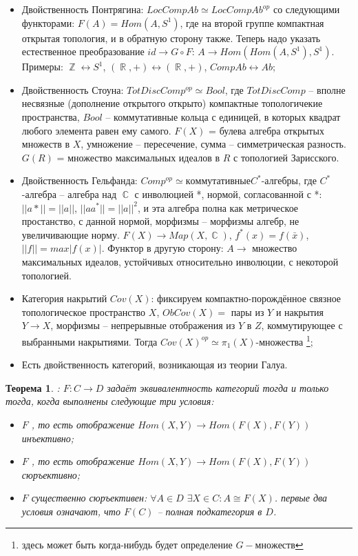 \documentclass[a4paper]{article}
\theoremstyle{indented}
\newtheorem{theorem}{Теорема}
\theoremstyle{definition}
\theoremstyle{remark}
\DeclareMathOperator{\CC}{\mathbb{C}}
\DeclareMathOperator{\ZZ}{\mathbb{Z}}
\DeclareMathOperator{\RR}{\mathbb{R}}
\begin{document}
\begin{itemize}
\item Двойственность Понтрягина: $LocCompAb\simeq LocCompAb^{op}$ со следующими функторами: $F(A) = Hom(A, S^1)$, где на второй группе компактная открытая топология, и в обратную сторону также. Теперь надо указать естественное преобразование $id \rightarrow G\circ F$: $A \rightarrow Hom(Hom(A, S^1), S^1)$. Примеры: $\ZZ \longleftrightarrow S^1$, $(\RR, +) \longleftrightarrow (\RR, +)$, $CompAb \longleftrightarrow Ab$;
\item Двойственность Стоуна: $TotDiscComp^{op} \simeq  Bool$, где $TotDiscComp$ -- вполне несвязные (дополнение открытого открыто) компактные топологичекие пространства, $Bool$ -- коммутативные кольца с единицей, в которых квадрат любого элемента равен ему самого. $F(X)$ = булева алгебра открытых множеств в $X$, умножение -- пересечение, сумма -- симметрическая разность. $G(R)$ = множество максимальных идеалов в $R$ с топологией Зарисского.
\item Двойственность Гельфанда: $Comp^{op} \simeq коммутативные C^*$-алгебры, где $C^*$-алгебра -- алгебра над $\CC$ с инволюцией *, нормой, согласованной с *: $||a*|| = ||a||$, $||aa^*|| = ||a||^2$, и эта алгебра полна как метрическое простанство, с данной нормой, морфизмы -- морфизмы алгебр, не увеличивающие норму. $F(X) \rightarrow Map(X, \CC)$, $f^*(x) = f(\bar{x})$, $||f|| = max|f(x)|$. Функтор в другую сторону: $A \rightarrow$ множество максимальных идеалов, устойчивых относительно инволюции, с некоторой топологией.
\item Категория накрытий $Cov(X)$: фиксируем компактно-порождённое связное топологическое пространство $X$, $ObCov(X) =$ пары из $Y$ и накрытия $Y \rightarrow X$, морфизмы -- непрерывные отображения из $Y$ в $Z$, коммутирующее с выбранными накрытиями. Тогда $Cov(X)^{op} \simeq \pi_{1}(X)$-множества \footnote{здесь может быть когда-нибудь будет определение $G-множеств$};
\item Есть двойственность категорий, возникающая из теории Галуа.
\end{itemize}
\begin{theorem} : 
$F: C\rightarrow D$ задаёт эквивалентность категорий тогда и только тогда, когда выполнены следующие три условия:\begin{itemize}
\item $F$ , то есть отображение $Hom(X, Y) \rightarrow Hom(F(X), F(Y))$ инъективно;
\item $F$ , то есть отображение $Hom(X, Y) \rightarrow Hom(F(X), F(Y))$ сюръективно;
\item $F$ существенно сюръективен: $\forall A \in D$ $\exists X \in C: A \cong F(X)$.
\remark первые два условия означают, что $F(C)$ -- полная подкатегория в $D$.
\end{itemize}
\end{theorem}
\end{document}
